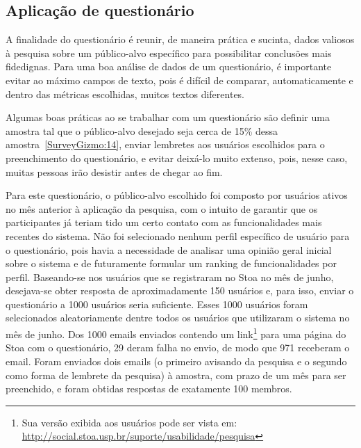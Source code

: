 \subsection{Aplicação de questionário}
\label{sec:aplic-form}

	A finalidade do questionário é reunir, de maneira prática e sucinta, dados valiosos à pesquisa sobre um público-alvo específico para possibilitar conclusões mais fidedignas. Para uma boa análise de dados de um questionário, é importante evitar ao máximo campos de texto, pois é difícil de comparar, automaticamente e dentro das métricas escolhidas, muitos textos diferentes.
	
	Algumas boas práticas ao se trabalhar com um questionário são definir uma amostra tal que o público-alvo desejado seja cerca de 15\% dessa amostra~\ref{SurveyGizmo:14}, enviar lembretes aos usuários escolhidos para o preenchimento do questionário, e evitar deixá-lo muito extenso, pois, nesse caso, muitas pessoas irão desistir antes de chegar ao fim.
	

	Para este questionário, o público-alvo escolhido foi composto por usuários ativos no mês anterior à aplicação da pesquisa, com o intuito de garantir que os participantes já teriam tido um certo contato com as funcionalidades mais recentes do sistema. Não foi selecionado nenhum perfil específico de usuário para o questionário, pois havia a necessidade de analisar uma opinião geral inicial sobre o sistema e de futuramente formular um ranking de funcionalidades por perfil. Baseando-se nos usuários que se registraram no Stoa no mês de junho, desejava-se obter resposta de aproximadamente 150 usuários \cite{penwarden:14} e, para isso, enviar o questionário a 1000 usuários seria suficiente. Esses 1000 usuários foram selecionados aleatoriamente dentre todos os usuários que utilizaram o sistema no mês de junho. Dos 1000 emails enviados contendo um link\footnote{Sua versão exibida aos usuários pode ser vista em: \url{http://social.stoa.usp.br/suporte/usabilidade/pesquisa}} para uma página do Stoa com o questionário, 29 deram falha no envio, de modo que 971 receberam o email. Foram enviados dois emails (o primeiro avisando da pesquisa e o segundo como forma de lembrete da pesquisa) à amostra, com prazo de um mês para ser preenchido, e foram obtidas respostas de exatamente 100 membros.


